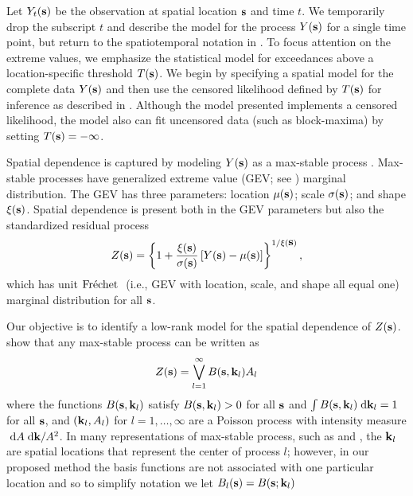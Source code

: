 \documentclass[11pt]{article}
\begin{document}
Let $Y_{t}(\mbox{\bf s})$ be the observation at spatial location $\mbox{\bf s}$ and time $t$.  We temporarily drop the subscript $t$ and describe the model for the process $Y(\mbox{\bf s})$ for a single time point, but return to the spatiotemporal notation in .
To focus attention on the extreme values, we emphasize the statistical model for exceedances above a location-specific threshold $T(\mbox{\bf s})$.
We begin by specifying a spatial model for the complete data $Y(\mbox{\bf s})$ and then use the censored likelihood defined by $T(\mbox{\bf s})$ for inference as described in .
Although the model presented implements a censored likelihood, the model also can fit uncensored data (such as block-maxima) by setting $T(\mbox{\bf s}) = -\infty$.

Spatial dependence is captured by modeling $Y(\mbox{\bf s})$ as a max-stable process \citep{deHaan2006}.
Max-stable processes have generalized extreme value (GEV; see ) marginal distribution.
The GEV has three parameters: location $\mu(\mbox{\bf s})$; scale $\sigma(\mbox{\bf s})$; and shape $\xi(\mbox{\bf s})$.
Spatial dependence is present both in the GEV parameters but also the standardized residual process
\begin{align} \label{ebeq:Y2Z}
 Z(\mbox{\bf s}) = \left\{1+\frac{\xi(\mbox{\bf s})}{\sigma(\mbox{\bf s})}\left[Y(\mbox{\bf s}) - \mu(\mbox{\bf s})\right]\right\}^{1/\xi(\mbox{\bf s})},
\end{align}
which has unit $\mbox{Fr$\acute{\mbox{e}}$chet }$ (i.e., GEV with location, scale, and shape all equal one) marginal distribution for all $\mbox{\bf s}$.

Our objective is to identify a low-rank model for the spatial dependence of $Z(\mbox{\bf s})$.
 show that any max-stable process can be written as
\begin{align} \label{ebeq:spectral}
  Z(\mbox{\bf s}) = \bigvee_{l = 1}^{\infty} B(\mbox{\bf s}, \mbox{\bf k}_l)A_{l}
\end{align}
where the functions $B(\mbox{\bf s}, \mbox{\bf k}_l)$ satisfy $B(\mbox{\bf s}, \mbox{\bf k}_l) > 0$ for all $\mbox{\bf s}$ and $\int B(\mbox{\bf s}, \mbox{\bf k}_l) \; \text{d} \mbox{\bf k}_l = 1$ for all $\mbox{\bf s}$, and $(\mbox{\bf k}_l, A_l)$ for $l=1,\ldots,\infty$ are a Poisson process with intensity measure $\; \text{d} A \; \text{d} \mbox{\bf k}/A^2$.
In many representations of max-stable process, such as \citet{Smith1990} and \citet{Reich2012}, the $\mbox{\bf k}_l$ are spatial locations that represent the center of process $l$; however, in our proposed method the basis functions are not associated with one particular location and so to simplify notation we let $B_l(\mbox{\bf s}) = B(\mbox{\bf s}; \mbox{\bf k}_l)$
\end{document}

